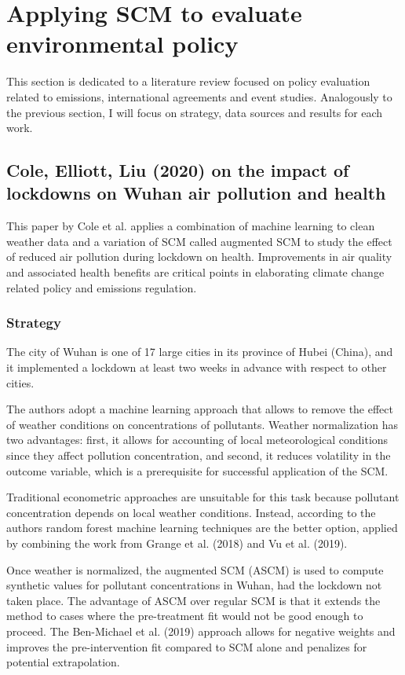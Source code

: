 \documentclass[12pt,a4paper,draft]{article}
\begin{document}
\section{Applying SCM to evaluate environmental policy}   %
This section is dedicated to a literature review focused on policy evaluation related 
to emissions, international agreements and event studies. Analogously to the previous 
section, I will focus on strategy, data sources and results for each work. 


\subsection{Cole, Elliott, Liu (2020) on the impact of lockdowns on Wuhan air pollution and health}
This paper by Cole et al. applies a combination of machine learning 
to clean weather data and a variation of SCM called augmented SCM to study the effect 
of reduced air pollution during lockdown on health. 
Improvements in air quality and associated health benefits are critical points in 
elaborating climate change related policy and emissions regulation. 


\subsubsection*{Strategy} %
The city of Wuhan is one of 17 large cities in its province of Hubei (China), and it 
implemented a lockdown at least two weeks in advance with respect to other cities. 

The authors adopt a machine learning approach that allows to remove the effect of 
weather conditions on concentrations of pollutants. 
Weather normalization has two advantages: first, it allows for accounting of local 
meteorological conditions since they affect pollution concentration, and second, 
it reduces volatility in the outcome variable, which is a prerequisite for successful 
application of the SCM.

Traditional econometric approaches are unsuitable for this task
because pollutant concentration depends on local weather conditions. 
Instead, according to the authors random forest machine learning techniques are 
the better option, applied by combining the work from Grange et al. (2018) and Vu et 
al. (2019).

Once weather is normalized, the augmented SCM (ASCM) is used to compute synthetic 
values for pollutant concentrations in Wuhan, had the lockdown not taken place. The 
advantage of ASCM over regular SCM is that it extends the method to cases where 
the pre-treatment fit would not be good enough to proceed. The Ben-Michael et al. (2019) 
approach allows for negative weights and improves the pre-intervention fit compared to 
SCM alone and penalizes for potential extrapolation. 
\end{document}

